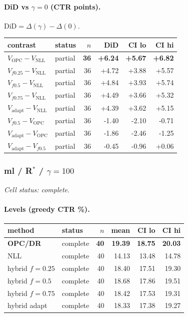 \documentclass[10pt,a4paper]{article}
\begin{document}
\paragraph{DiD vs $\gamma=0$ (CTR points).} $\mathrm{DiD}=\Delta(\gamma)-\Delta(0)$.
{\centering\small\begin{tabular}{llrrrr}
\toprule contrast & status & $n$ & DiD & CI lo & CI hi \\
\midrule
\textbf{$V_{\mathrm{OPC}}-V_{\mathrm{NLL}}$} & partial & \textbf{36} & \textbf{+6.24} & \textbf{+5.67} & \textbf{+6.82} \\
$V_{f0.25}-V_{\mathrm{NLL}}$ & partial & 36 & +4.72 & +3.88 & +5.57 \\
$V_{f0.5}-V_{\mathrm{NLL}}$ & partial & 36 & +4.84 & +3.93 & +5.74 \\
$V_{f0.75}-V_{\mathrm{NLL}}$ & partial & 36 & +4.49 & +3.66 & +5.32 \\
$V_{\mathrm{adapt}}-V_{\mathrm{NLL}}$ & partial & 36 & +4.39 & +3.62 & +5.15 \\
$V_{f0.5}-V_{\mathrm{OPC}}$ & partial & 36 & -1.40 & -2.10 & -0.71 \\
$V_{\mathrm{adapt}}-V_{\mathrm{OPC}}$ & partial & 36 & -1.86 & -2.46 & -1.25 \\
$V_{\mathrm{adapt}}-V_{f0.5}$ & partial & 36 & -0.45 & -0.96 & +0.06 \\
\bottomrule\end{tabular}\par}
\bigskip
\subsubsection{ml / R$^*$ / $\gamma=100$}
\emph{Cell status: complete}.
\paragraph{Levels (greedy CTR \%).}
{\centering\small\begin{tabular}{llrrrr}
\toprule method & status & $n$ & mean & CI lo & CI hi \\
\midrule
\textbf{OPC/DR} & complete & \textbf{40} & \textbf{19.39} & \textbf{18.75} & \textbf{20.03} \\
NLL & complete & 40 & 14.13 & 13.48 & 14.78 \\
hybrid $f{=}0.25$ & complete & 40 & 18.40 & 17.51 & 19.30 \\
hybrid $f{=}0.5$ & complete & 40 & 18.68 & 17.86 & 19.51 \\
hybrid $f{=}0.75$ & complete & 40 & 18.42 & 17.53 & 19.31 \\
hybrid adapt & complete & 40 & 18.33 & 17.38 & 19.27 \\
\bottomrule\end{tabular}\par}
\end{document}

